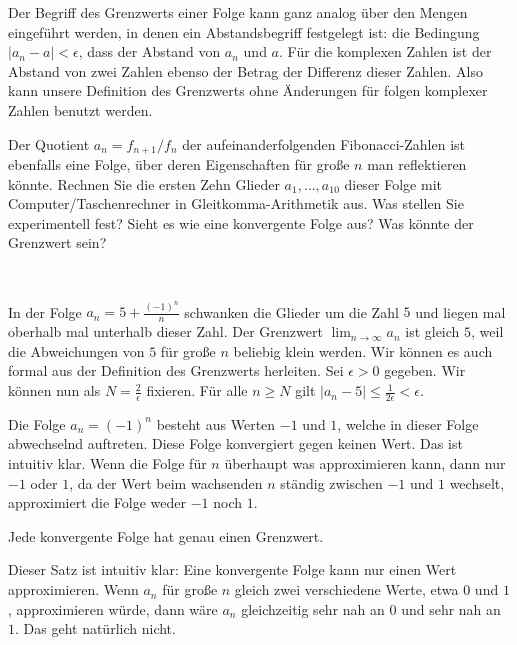 \begin{bem}
	Der Begriff des Grenzwerts einer Folge kann ganz analog über den Mengen eingeführt werden, in denen ein Abstandsbegriff festgelegt ist: die Bedingung $|a_n - a| < \epsilon$, dass der Abstand von $a_n$ und $a$. Für die komplexen Zahlen ist der Abstand von zwei  Zahlen ebenso der Betrag der Differenz dieser Zahlen. Also kann unsere Definition des Grenzwerts ohne Änderungen für folgen komplexer Zahlen benutzt werden. 
\end{bem} 

\begin{aufg}
Der Quotient $a_n = f_{n+1} / f_n$ der aufeinanderfolgenden Fibonacci-Zahlen ist ebenfalls eine Folge, über deren Eigenschaften für große $n$ man reflektieren könnte. Rechnen Sie die ersten Zehn Glieder $a_1,\ldots,a_{10}$ dieser Folge mit Computer/Taschenrechner in Gleitkomma-Arithmetik aus. Was stellen Sie experimentell fest? Sieht es wie eine konvergente Folge aus? Was könnte der Grenzwert sein? 
\end{aufg} 

\begin{bsp} {\ } 
	\begin{enuma} 
		\item In der Folge $a_n = 5 + \frac{(-1)^n}{n}$ schwanken die Glieder um die Zahl $5$ und liegen mal oberhalb mal unterhalb dieser Zahl. Der Grenzwert $\lim_{n \to \infty} a_n$ ist gleich $5$, weil die Abweichungen von $5$ für große $n$ beliebig klein werden. Wir können es auch formal aus der Definition des Grenzwerts herleiten. Sei $\epsilon>0$ gegeben. Wir können nun als $N = \frac{2}{ \epsilon}$ fixieren. Für alle $n \ge N$ gilt $|a_n - 5|  \le \frac{1}{2 \epsilon} < \epsilon$. 
		\item Die Folge $a_n = (-1)^n$ besteht aus Werten $-1$ und $1$, welche in dieser Folge abwechselnd auftreten. Diese Folge konvergiert gegen keinen Wert. Das ist intuitiv klar. Wenn die Folge für $n$ überhaupt was approximieren kann, dann nur $-1$ oder $1$, da der Wert beim wachsenden $n$ ständig zwischen $-1$ und $1$ wechselt, approximiert die Folge weder $-1$ noch $1$. 
	\end{enuma} 
\end{bsp} 

\begin{thm} 
	Jede konvergente Folge hat genau einen Grenzwert. 
\end{thm} 

\begin{bem} Dieser Satz ist intuitiv klar: Eine konvergente Folge kann nur einen Wert approximieren. Wenn $a_n$ für große $n$ gleich zwei verschiedene Werte, etwa $0$ und $1$, approximieren würde, dann wäre $a_n$ gleichzeitig sehr nah an $0$ und sehr nah an $1$. Das geht natürlich nicht. 
\end{bem} 

